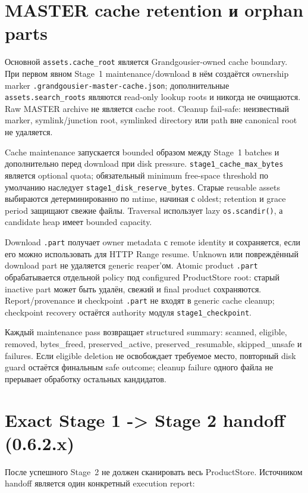 \section{MASTER cache retention и orphan parts}

Основной \texttt{assets.cache\_root} является Grandgousier-owned cache boundary. При первом явном Stage~1 maintenance/download в нём создаётся ownership marker \texttt{.grandgousier-master-cache.json}; дополнительные \texttt{assets.search\_roots} являются read-only lookup roots и никогда не очищаются. Raw MASTER archive не является cache root. Cleanup fail-safe: неизвестный marker, symlink/junction root, symlinked directory или path вне canonical root не удаляется.

Cache maintenance запускается bounded образом между Stage~1 batches и дополнительно перед download при disk pressure. \texttt{stage1\_cache\_max\_bytes} является optional quota; обязательный minimum free-space threshold по умолчанию наследует \texttt{stage1\_disk\_reserve\_bytes}. Старые reusable assets выбираются детерминированно по mtime, начиная с oldest; retention и grace period защищают свежие файлы. Traversal использует lazy \texttt{os.scandir()}, а candidate heap имеет bounded capacity.

Download \texttt{.part} получает owner metadata с remote identity и сохраняется, если его можно использовать для HTTP Range resume. Unknown или повреждённый download part не удаляется generic reaper'ом. Atomic product \texttt{.part} обрабатывается отдельной policy под configured ProductStore root: старый inactive part может быть удалён, свежий и final product сохраняются. Report/provenance и checkpoint \texttt{.part} не входят в generic cache cleanup; checkpoint recovery остаётся authority модуля \texttt{stage1\_checkpoint}.

Каждый maintenance pass возвращает structured summary: scanned, eligible, removed, bytes\_freed, preserved\_active, preserved\_resumable, skipped\_unsafe и failures. Если eligible deletion не освобождает требуемое место, повторный disk guard остаётся финальным safe outcome; cleanup failure одного файла не прерывает обработку остальных кандидатов.

\section{Exact Stage 1 -> Stage 2 handoff (0.6.2.x)}

После успешного  Stage~2 не должен сканировать весь ProductStore. Источником handoff является один конкретный execution report:

